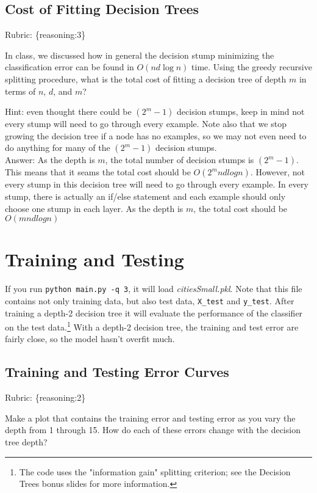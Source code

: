 \documentclass{article}
\def\blu#1{{\color{blu}#1}}
\def\gre#1{{\color{gre}#1}}
\def\rubric#1{\gre{Rubric: \{#1\}}}{}
\begin{document}
\subsection{Cost of Fitting Decision Trees}
\rubric{reasoning:3}

In class, we discussed how in general the decision stump minimizing the classification error can be found in $O(nd\log n)$ time.
Using the greedy recursive splitting procedure, \blu{what is the total cost of fitting a decision tree of depth $m$ in terms of $n$, $d$, and $m$?}

Hint: even thought there could be $(2^m-1)$ decision stumps, keep in mind not every stump will need to go through every example. Note also that we stop growing the decision tree if a node has no examples, so we may not even need to do anything for many of the $(2^m-1)$ decision stumps.
\textcolor{gre}{
\\Answer:
As the depth is $m$, the total number of decision stumps is $(2^m-1)$. This means that it seams the total cost should be $O(2^mndlog n)$. However, not every stump in this decision tree will need to go through every example. In every stump, there is actually an if/else statement and each example should only choose one stump in each layer. As the depth is $m$, the total cost should be $O(mndlog n)$
}

\section{Training and Testing}
If you run \texttt{python main.py \string-q 3}, it will load \emph{citiesSmall.pkl}.
Note that this file contains not only training data, but also test data, \texttt{X\string_test} and \texttt{y\string_test}.
After training a depth-2 decision tree it will evaluate the performance of the classifier on the test data.\footnote{The code uses the "information gain" splitting criterion; see the Decision Trees bonus slides for more information.}
With a depth-2 decision tree, the training and test error are fairly close, so the model hasn't overfit much.

\subsection{Training and Testing Error Curves}
\rubric{reasoning:2}

\blu{Make a plot that contains the training error and testing error as you vary the depth from 1 through 15. How do each of these errors change with the decision tree depth?}
\end{document}

